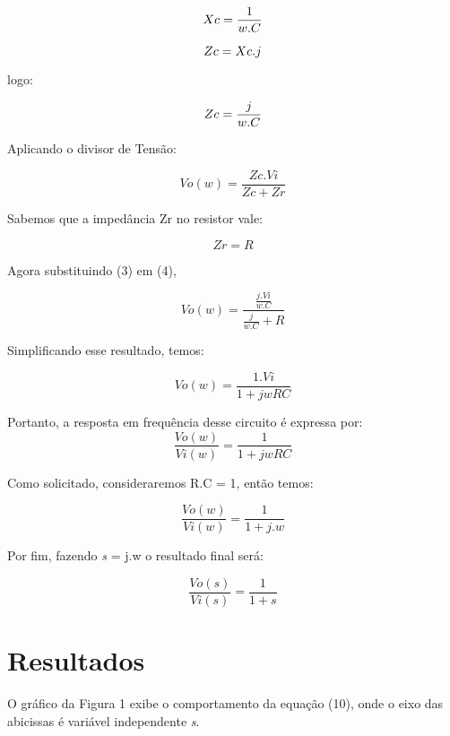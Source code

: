\documentclass[12pt]{article}
\begin{document}
\begin{equation}
Xc = \frac{1}{w.C}\\
\end{equation}

\begin{equation}
Zc = Xc.j\\
\end{equation}

logo:

\begin{equation}
Zc = \frac{j}{w.C}\\
\end{equation}

Aplicando o divisor de Tensão:

\begin{equation}
Vo(w)=\frac{Zc.Vi}{Zc+Zr}
\end{equation}

Sabemos que a impedância Zr no resistor vale:

\begin{equation}
Zr= R
\end{equation}


Agora substituindo (3) em (4), 

\begin{equation}
Vo(w)=\frac{\frac{j.Vi}{w.C}}{\frac{j}{w.C} + R}
\end{equation}

Simplificando esse resultado, temos: 

\begin{equation}
Vo(w)=\frac{1.Vi}{1+jwRC}
\end{equation}

Portanto, a resposta em frequência desse circuito é expressa por:
\begin{equation}
\frac{Vo(w)}{Vi(w)}=\frac{1}{1+jwRC}
\end{equation}

Como solicitado, consideraremos R.C = 1, então temos:

\begin{equation}
\frac{Vo(w)}{Vi(w)}=\frac{1}{1+j.w}
\end{equation}

Por fim, fazendo \textit{s} = j.w o resultado final será:

\begin{equation}
\frac{Vo(s)}{Vi(s)}=\frac{1}{1+\textit{s}}
\end{equation}

\section{Resultados}
O gráfico da Figura 1 exibe o comportamento da equação (10), onde o eixo das abicissas é variável independente  \textit{s}. 
\end{document}
